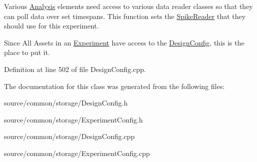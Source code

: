 Various \hyperlink{class_picto_1_1_analysis}{Analysis} elements need access to various data reader classes so that they can poll data over set timespans. This function sets the \hyperlink{class_picto_1_1_spike_reader}{Spike\-Reader} that they should use for this experiment. 

Since All Assets in an \hyperlink{class_picto_1_1_experiment}{Experiment} have access to the \hyperlink{class_picto_1_1_design_config}{Design\-Config}, this is the place to put it. 

Definition at line 502 of file Design\-Config.\-cpp.



The documentation for this class was generated from the following files\-:\begin{DoxyCompactItemize}
\item 
source/common/storage/Design\-Config.\-h\item 
source/common/storage/Experiment\-Config.\-h\item 
source/common/storage/Design\-Config.\-cpp\item 
source/common/storage/Experiment\-Config.\-cpp\end{DoxyCompactItemize}
